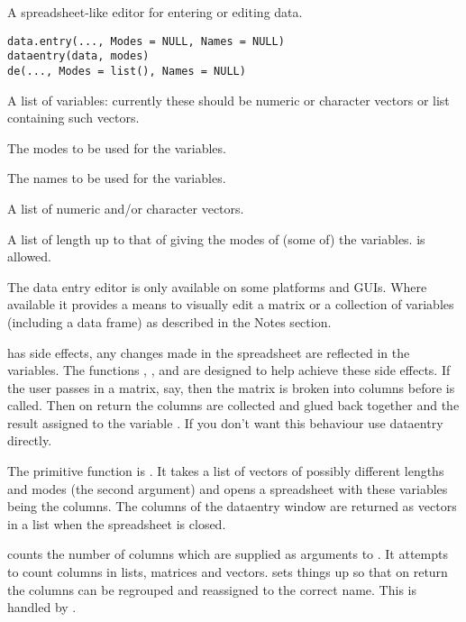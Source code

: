 %
\begin{Description}\relax
A spreadsheet-like editor for entering or editing data.
\end{Description}
%
\begin{Usage}
\begin{verbatim}
data.entry(..., Modes = NULL, Names = NULL)
dataentry(data, modes)
de(..., Modes = list(), Names = NULL)
\end{verbatim}
\end{Usage}
%
\begin{Arguments}
\begin{ldescription}
\item[\code{...}] A list of variables: currently these should be numeric or
character vectors or list containing such vectors.
\item[\code{Modes}] The modes to be used for the variables.
\item[\code{Names}] The names to be used for the variables.
\item[\code{data}] A list of numeric and/or character vectors.
\item[\code{modes}] A list of length up to that of  giving the
modes of (some of) the variables.  is allowed.
\end{ldescription}
\end{Arguments}
%
\begin{Details}\relax
The data entry editor is only available on some platforms and GUIs.
Where available it provides a means to visually edit a matrix or
a collection of variables (including a data frame) as described in the
Notes section.

 has side effects, any changes made in the
spreadsheet are reflected in the variables.  The functions ,
,  and  are designed to
help achieve these side effects. If the user passes in a matrix,
 say, then the matrix is broken into columns before
 is called. Then on return the columns are collected
and glued back together and the result assigned to the variable
.  If you don't want this behaviour use dataentry directly.

The primitive function is . It takes a list of
vectors of possibly different lengths and modes (the second argument)
and opens a spreadsheet with these variables being the columns.
The columns of the dataentry window are returned as vectors in a
list when the spreadsheet is closed.

 counts the number of columns which are supplied as arguments
to . It attempts to count columns in lists, matrices
and vectors.   sets things up so that on return the
columns can be regrouped and reassigned to the correct name. This
is handled by .
\end{Details}

